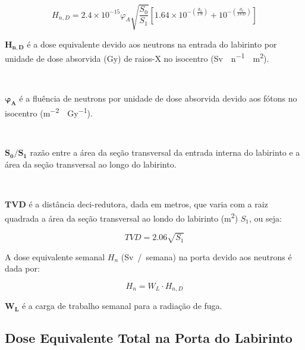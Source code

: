 \documentclass[11pt,a4paper]{article}
\newcounter{exemplo}
\begin{document}
        \begin{equation}
            H_{n,D} = 2.4 \times 10^{-15} \varphi_A \sqrt{\frac{S_0}{S_1}}
            \left[1.64 \times 10^{-\left(\frac{d_2}{1.9}\right)} + 10^{-\left(\frac{d_2}{TVD}\right)}\right]
        \end{equation}

        \begin{exemplo}[onde:]
            \textcolor{CarnationPink}{$\mathbf{H_{n,D}}$} é a dose equivalente devido aos neutrons na entrada do labirinto por unidade de dose absorvida (Gy) de raios-X no isocentro (\unit{Sv \cdot n^{-1} \cdot m^2}).

            \

            \textcolor{CarnationPink}{$\mathbf{\varphi_A}$} é a fluência de neutrons por unidade de dose absorvida devido aos fótons no isocentro (\unit{m^{-2} \cdot Gy^{-1}}).

            \

            \textcolor{CarnationPink}{$\mathbf{S_0/S_1}$} razão entre a área da seção transversal da entrada interna do labirinto e a área da seção transversal ao longo do labirinto.

            \

            \textcolor{CarnationPink}{$\mathbf{TVD}$} é a distância deci-redutora, dada em metros, que varia com a raiz quadrada a área da seção transversal ao londo do labirinto (\unit{m^2}) $S_1$, ou seja:

                \begin{equation}
                    TVD = 2.06 \sqrt{S_1}
                \end{equation}
        \end{exemplo}

        A dose equivalente semanal $H_n$ (\unit{Sv / semana}) na porta devido aos neutrons é dada por:

        \begin{equation}
            H_n = W_L \cdot H_{n,D}
            \label{eq:doseEquivalenteNeutrons}
        \end{equation}

        \begin{exemplo}[onde:]
            \textcolor{CarnationPink}{$\mathbf{W_L}$} é a carga de trabalho semanal para a radiação de fuga.
        \end{exemplo}

    \subsection{Dose Equivalente Total na Porta do Labirinto}   
\end{document}
